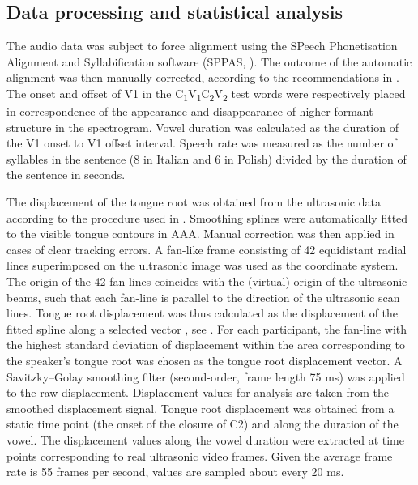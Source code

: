 \documentclass[12pt,]{article}
\begin{document}
\hypertarget{data-processing-and-statistical-analysis}{%
\subsection{Data processing and statistical
analysis}\label{data-processing-and-statistical-analysis}}

\label{s:process}

The audio data was subject to force alignment using the SPeech
Phonetisation Alignment and Syllabification software (SPPAS,
\citealt{bigi2015}). The outcome of the automatic alignment was then
manually corrected, according to the recommendations in
\citet{machac2009}. The onset and offset of V1 in the
C\textsubscript{1}V\textsubscript{1}C\textsubscript{2}V\textsubscript{2}
test words were respectively placed in correspondence of the appearance
and disappearance of higher formant structure in the spectrogram. Vowel
duration was calculated as the duration of the V1 onset to V1 offset
interval. Speech rate was measured as the number of syllables in the
sentence (8 in Italian and 6 in Polish) divided by the duration of the
sentence in seconds.

The displacement of the tongue root was obtained from the ultrasonic
data according to the procedure used in \citet{kirkham2017}. Smoothing
splines were automatically fitted to the visible tongue contours in AAA.
Manual correction was then applied in cases of clear tracking errors. A
fan-like frame consisting of 42 equidistant radial lines superimposed on
the ultrasonic image was used as the coordinate system. The origin of
the 42 fan-lines coincides with the (virtual) origin of the ultrasonic
beams, such that each fan-line is parallel to the direction of the
ultrasonic scan lines. Tongue root displacement was thus calculated as
the displacement of the fitted spline along a selected vector
\citep{strycharczuk2015}, see . For each participant, the
fan-line with the highest standard deviation of displacement within the
area corresponding to the speaker's tongue root was chosen as the tongue
root displacement vector. A Savitzky--Golay smoothing filter
(second-order, frame length 75 ms) was applied to the raw displacement.
Displacement values for analysis are taken from the smoothed
displacement signal. Tongue root displacement was obtained from a static
time point (the onset of the closure of C2) and along the duration of
the vowel. The displacement values along the vowel duration were
extracted at time points corresponding to real ultrasonic video frames.
Given the average frame rate is 55 frames per second, values are sampled
about every 20 ms.
\end{document}
